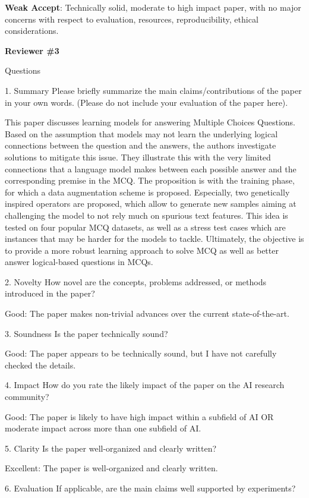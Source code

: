 \documentclass{article}
\begin{document}
\textbf{Weak Accept}: Technically solid, moderate to high impact paper, with no major concerns with respect to evaluation, resources, reproducibility, ethical considerations.

\textbf{\Large{Reviewer \#3}}

Questions

1. {Summary} Please briefly summarize the main claims/contributions of the paper in your own words. (Please do not include your evaluation of the paper here).

This paper discusses learning models for answering Multiple Choices Questions. Based on the assumption that models may not learn the underlying logical connections between the question and the answers, the authors investigate solutions to mitigate this issue. They illustrate this with the very limited connections that a language model makes between each possible answer and the corresponding premise in the MCQ. The proposition is with the training phase, for which a data augmentation scheme is proposed. Especially, two genetically inspired operators are proposed, which allow to generate new samples aiming at challenging the model to not rely much on spurious text features. This idea is tested on four popular MCQ datasets, as well as a stress test cases which are instances that may be harder for the models to tackle. Ultimately, the objective is to provide a more robust learning approach to solve MCQ as well as better answer logical-based questions in MCQs.

2. {Novelty} How novel are the concepts, problems addressed, or methods introduced in the paper?

Good: The paper makes non-trivial advances over the current state-of-the-art.

3. {Soundness} Is the paper technically sound?

Good: The paper appears to be technically sound, but I have not carefully checked the details.

4. {Impact} How do you rate the likely impact of the paper on the AI research community?

Good: The paper is likely to have high impact within a subfield of AI OR moderate impact across more than one subfield of AI.

5. {Clarity} Is the paper well-organized and clearly written?

Excellent: The paper is well-organized and clearly written.

6. {Evaluation} If applicable, are the main claims well supported by experiments?
\end{document}
